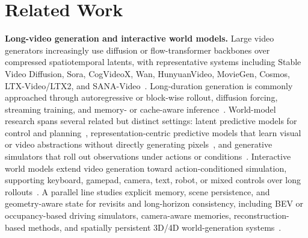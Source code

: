 \section{Related Work}
\label{sec:related_work}











\noindent\textbf{Long-video generation and interactive world models.}
Large video generators increasingly use diffusion or flow-transformer backbones over compressed spatiotemporal latents, with representative systems including Stable Video Diffusion, Sora, CogVideoX, Wan, HunyuanVideo, MovieGen, Cosmos, LTX-Video/LTX2, and SANA-Video~\citep{stable_video_diffusion,sora,cogvideox,wan,hunyuanvideo,moviegen,cosmos,ltx_video,ltx2,chen2025sana}.
Long-duration generation is commonly approached through autoregressive or block-wise rollout, diffusion forcing, streaming training, and memory- or cache-aware inference~\citep{skyreels_v2,magi,huang2024selfforcing,longlive,chen2025sana}.
World-model research spans several related but distinct settings: latent predictive models for control and planning~\citep{world_models,dreamerv3}, representation-centric predictive models that learn visual or video abstractions without directly generating pixels~\citep{i_jepa,v_jepa,v_jepa2}, and generative simulators that roll out observations under actions or conditions~\citep{gaia1,genie,genie2,genie3,gamengen,oasis,gamegen,matrixgame,matrixgame3,relic,live_world,astra,magicworld,lingbot_world,infinite_world,yume,hy_worldplay}.
Interactive world models extend video generation toward action-conditioned simulation, supporting keyboard, gamepad, camera, text, robot, or mixed controls over long rollouts~\citep{dreamzero,dreamdojo,genie3,gamegen,matrixgame,matrixgame3,unisim,yume,aether,hy_worldplay,lingbot_world,worldcam,ucm,captain_safari,deepverse}.
A parallel line studies explicit memory, scene persistence, and geometry-aware state for revisits and long-horizon consistency, including BEV or occupancy-based driving simulators, camera-aware memories, reconstruction-based methods, and spatially persistent 3D/4D world-generation systems~\citep{drivedreamer,driveworld,ucm,mosaicmem,captain_safari,memorize_when_needed,vggt_world,aether,deepverse,versecrafter,hy_world2,inspatio_world,worldcam}.

